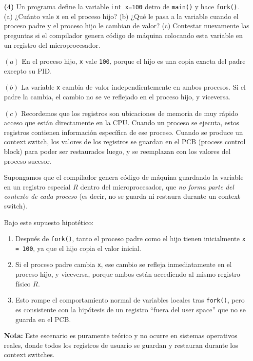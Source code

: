 \documentclass[12pt]{article}
\theoremstyle{definition}
\begin{document}
\pagebreak 

\begin{shaded}
    \textbf{(4)} Un programa define la variable \texttt{int x=100} detro de
    \texttt{main()} y hace \texttt{fork()}.
(a) ¿Cuánto vale \texttt{x} en el proceso hijo?
(b) ¿Qué le pasa a la variable cuando el proceso padre y el proceso hijo le cambian de valor?
(c) Contestar nuevamente las preguntas si el compilador genera código de máquina
colocando esta variable en un registro del microprocesador.
\end{shaded}

$(a)$ En el proceso hijo, \texttt{x} vale \texttt{100}, porque el hijo es una
copia exacta del padre excepto su PID.

$(b)$ La variable \texttt{x} cambia de valor independientemente en ambos
procesos. Si el padre la cambia, el cambio no se ve reflejado en el proceso
hijo, y viceversa. 

$(c)$ Recordemos que los registros son ubicaciones de memoria de muy rápido
acceso que están directamente en la CPU. Cuando un proceso se ejecuta, estos
registros contienen información específica de ese proceso. Cuando se produce un
context switch, los valores de los registros se guardan en el PCB (process
control block) para poder ser restaurados luego, y se reemplazan con los valores
del proceso sucesor.

Supongamos que el compilador genera código de máquina guardando la variable en
un registro especial $R$ dentro del microprocesador, que \textit{no forma parte
del contexto de cada proceso} (es decir, no se guarda ni restaura durante un
context switch).  

Bajo este supuesto hipotético:  

\begin{enumerate}
    \item Después de \texttt{fork()}, tanto el proceso padre como el hijo tienen
inicialmente \texttt{x = 100}, ya que el hijo copia el valor inicial.  
\item Si el
proceso padre cambia \texttt{x}, ese cambio se refleja inmediatamente en el
proceso hijo, y viceversa, porque ambos están accediendo al mismo registro
físico $R$.  
\item  Esto rompe el comportamiento normal de variables locales tras
\texttt{fork()}, pero es consistente con la hipótesis de un registro “fuera del
user space” que no se guarda en el PCB.  
\end{enumerate} 

\textbf{Nota:} Este escenario es puramente teórico y no ocurre en sistemas
operativos reales, donde todos los registros de usuario se guardan y restauran
durante los context switches.
\end{document}
